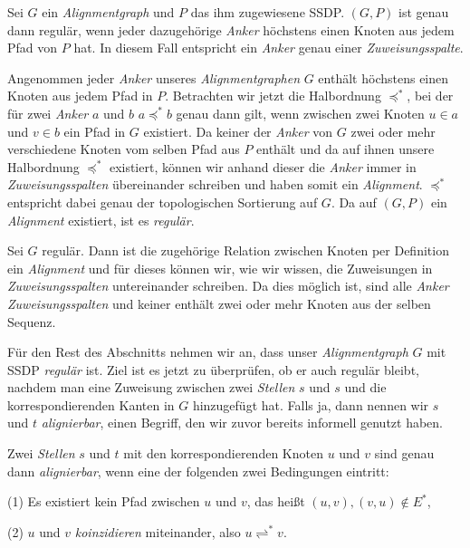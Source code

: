 \begin{lemma}
	Sei $G$ ein \emph{Alignmentgraph} und $P$ das ihm zugewiesene SSDP. $(G,P)$ ist genau dann regulär, wenn jeder dazugehörige \emph{Anker} höchstens einen Knoten aus jedem Pfad von $P$ hat. In diesem Fall entspricht ein \emph{Anker} genau einer \emph{Zuweisungsspalte}.
\end{lemma}

\begin{beweis}
	\bewhin Angenommen jeder \emph{Anker} unseres \emph{Alignmentgraphen} $G$ enthält höchstens einen Knoten aus jedem Pfad in $P$. Betrachten wir jetzt die Halbordnung $\preceq^{*}$, bei der für zwei \emph{Anker} $a$ und $b$ $a \preceq^{*} b$ genau dann gilt, wenn zwischen zwei Knoten $u \in a$ und $v \in b$ ein Pfad in $G$ existiert. Da keiner der \emph{Anker} von $G$ zwei oder mehr verschiedene Knoten vom selben Pfad aus $P$ enthält und da auf ihnen unsere Halbordnung $\preceq^{*}$ existiert, können wir anhand dieser die \emph{Anker} immer in \emph{Zuweisungsspalten} übereinander schreiben und haben somit ein \emph{Alignment}. $\preceq^{*}$ entspricht dabei genau der topologischen Sortierung auf $G$. Da auf $(G,P)$ ein \emph{Alignment} existiert, ist es \emph{regulär}.
	
	\bewrueck Sei $G$ regulär. Dann ist die zugehörige Relation zwischen Knoten per Definition ein \emph{Alignment} und für dieses können wir, wie wir wissen, die Zuweisungen in \emph{Zuweisungsspalten} untereinander schreiben. Da dies möglich ist, sind alle \emph{Anker} \emph{Zuweisungsspalten} und keiner enthält zwei oder mehr Knoten aus der selben Sequenz.
\end{beweis}

Für den Rest des Abschnitts nehmen wir an, dass unser \emph{Alignmentgraph} $G$ mit SSDP \emph{regulär} ist. Ziel ist es jetzt zu überprüfen, ob er auch regulär bleibt, nachdem man eine Zuweisung zwischen zwei \emph{Stellen} $s$ und $s$ und die korrespondierenden Kanten in $G$ hinzugefügt hat. Falls ja, dann nennen wir $s$ und $t$ \emph{alignierbar}, einen Begriff, den wir zuvor bereits informell genutzt haben.

\begin{lemma}
	Zwei \emph{Stellen} $s$ und $t$ mit den korrespondierenden Knoten $u$ und $v$ sind genau dann \emph{alignierbar}, wenn eine der folgenden zwei Bedingungen eintritt:
	
	(1) Es existiert kein Pfad zwischen $u$ und $v$, das heißt $(u,v),(v,u) \notin E^{*}$,
	
	(2) $u$ und $v$ \emph{koinzidieren} miteinander, also $u \rightleftharpoons^{*} v$.
\end{lemma}

